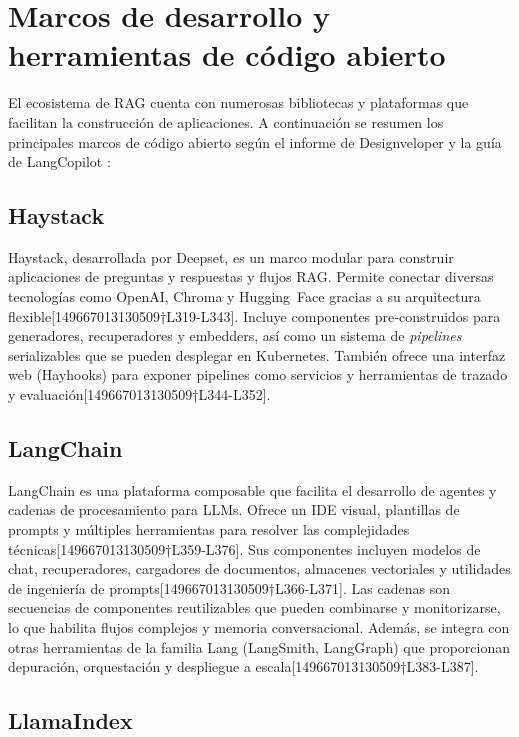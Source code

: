 \section{Marcos de desarrollo y herramientas de código abierto}

El ecosistema de RAG cuenta con numerosas bibliotecas y plataformas que facilitan la construcción de aplicaciones.  A continuación se resumen los principales marcos de código abierto según el informe de Designveloper \cite{designveloper2025frameworks} y la guía de LangCopilot \cite{langcopilot2025guide}:

\subsection{Haystack}

Haystack, desarrollada por Deepset, es un marco modular para construir aplicaciones de preguntas y respuestas y flujos RAG.  Permite conectar diversas tecnologías como OpenAI, Chroma y Hugging Face gracias a su arquitectura flexible[149667013130509†L319-L343].  Incluye componentes pre‑construidos para generadores, recuperadores y embedders, así como un sistema de \textit{pipelines} serializables que se pueden desplegar en Kubernetes.  También ofrece una interfaz web (Hayhooks) para exponer pipelines como servicios y herramientas de trazado y evaluación[149667013130509†L344-L352].

\subsection{LangChain}

LangChain es una plataforma composable que facilita el desarrollo de agentes y cadenas de procesamiento para LLMs.  Ofrece un IDE visual, plantillas de prompts y múltiples herramientas para resolver las complejidades técnicas[149667013130509†L359-L376].  Sus componentes incluyen modelos de chat, recuperadores, cargadores de documentos, almacenes vectoriales y utilidades de ingeniería de prompts[149667013130509†L366-L371].  Las cadenas son secuencias de componentes reutilizables que pueden combinarse y monitorizarse, lo que habilita flujos complejos y memoria conversacional.  Además, se integra con otras herramientas de la familia Lang (LangSmith, LangGraph) que proporcionan depuración, orquestación y despliegue a escala[149667013130509†L383-L387].

\subsection{LlamaIndex}

